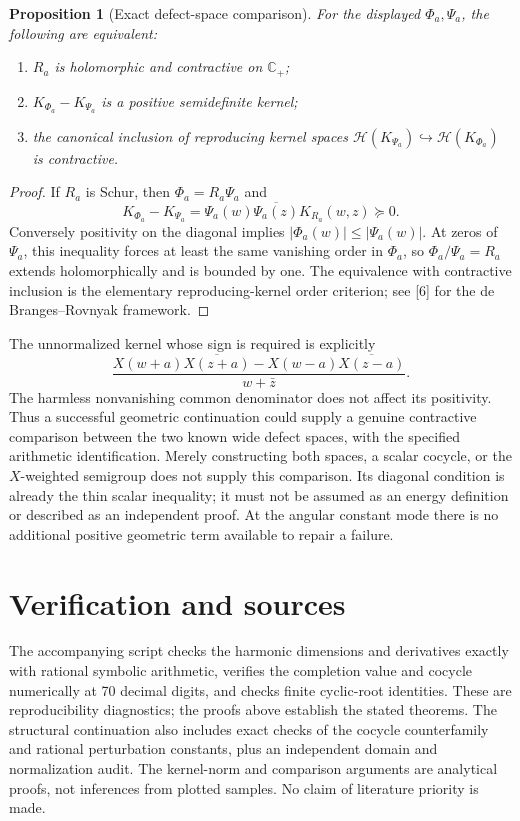 \documentclass[11pt,letterpaper]{article}
\newtheorem{proposition}[theorem]{Proposition}
\newcommand{\CP}{\mathbb C_+}
\begin{document}
\begin{proposition}[Exact defect-space comparison]\label{prop:comparison}
For the displayed $\Phi_a,\Psi_a$, the following are equivalent:
\begin{enumerate}
\item $R_a$ is holomorphic and contractive on $\CP$;
\item $K_{\Phi_a}-K_{\Psi_a}$ is a positive semidefinite kernel;
\item the canonical inclusion of reproducing kernel spaces
$\mathcal H(K_{\Psi_a})\hookrightarrow\mathcal H(K_{\Phi_a})$ is contractive.
\end{enumerate}
\end{proposition}
\begin{proof}
If $R_a$ is Schur, then $\Phi_a=R_a\Psi_a$ and
\[
 K_{\Phi_a}-K_{\Psi_a}=\Psi_a(w)\overline{\Psi_a(z)}K_{R_a}(w,z)\succeq0.
\]
Conversely positivity on the diagonal implies $|\Phi_a(w)|\leq|\Psi_a(w)|$. At zeros of $\Psi_a$, this inequality forces at least the same vanishing order in $\Phi_a$, so $\Phi_a/\Psi_a=R_a$ extends holomorphically and is bounded by one. The equivalence with contractive inclusion is the elementary reproducing-kernel order criterion; see [6] for the de Branges--Rovnyak framework.
\end{proof}
The unnormalized kernel whose sign is required is explicitly
\[
 \frac{X(w+a)\overline{X(z+a)}-X(w-a)\overline{X(z-a)}}{w+\bar z}.
\]
The harmless nonvanishing common denominator does not affect its positivity. Thus a successful geometric continuation could supply a genuine contractive comparison between the two known wide defect spaces, with the specified arithmetic identification. Merely constructing both spaces, a scalar cocycle, or the $X$-weighted semigroup does not supply this comparison. Its diagonal condition is already the thin scalar inequality; it must not be assumed as an energy definition or described as an independent proof. At the angular constant mode there is no additional positive geometric term available to repair a failure.

\section*{Verification and sources}
The accompanying script checks the harmonic dimensions and derivatives exactly with rational symbolic arithmetic, verifies the completion value and cocycle numerically at 70 decimal digits, and checks finite cyclic-root identities. These are reproducibility diagnostics; the proofs above establish the stated theorems. The structural continuation also includes exact checks of the cocycle counterfamily and rational perturbation constants, plus an independent domain and normalization audit. The kernel-norm and comparison arguments are analytical proofs, not inferences from plotted samples. No claim of literature priority is made.
\end{document}
